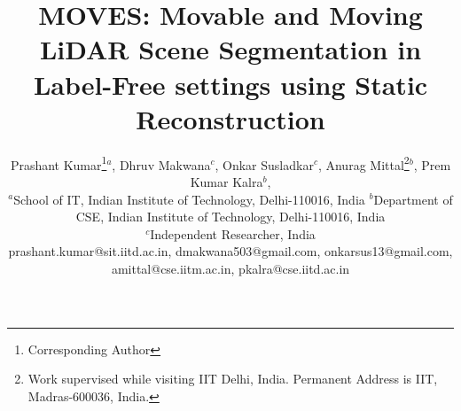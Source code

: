 \documentclass[review]{elsarticle}
\begin{document}
\begin{frontmatter}

\title{MOVES: Movable and Moving LiDAR Scene Segmentation in Label-Free settings using Static Reconstruction}

\author{Prashant Kumar\footnote[1]{Corresponding Author}$^a$, Dhruv Makwana$^c$, Onkar Susladkar$^c$, Anurag Mittal\footnote[2]{Work supervised while visiting IIT Delhi, India. Permanent Address is IIT, Madras-600036, India.}$^b$, Prem Kumar Kalra$^b$,\\
$^a$School of IT, Indian Institute of Technology, Delhi-110016, India $^b$Department of CSE, Indian Institute of Technology, Delhi-110016, India\\$^c$Independent Researcher, India\\
prashant.kumar@sit.iitd.ac.in, dmakwana503@gmail.com, onkarsus13@gmail.com, amittal@cse.iitm.ac.in, pkalra@cse.iitd.ac.in}




\end{frontmatter}











\end{document}
